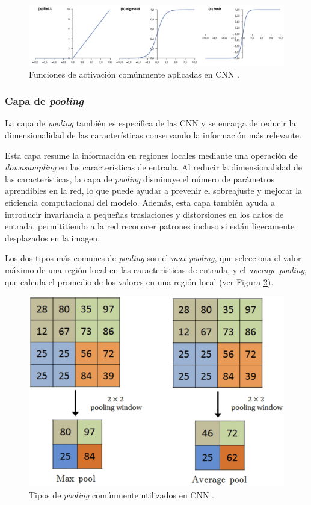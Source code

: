\begin{figure}[h]
	\centering
	\includegraphics[scale=0.55]{imagenes/cap2/activation.png}
	\caption[Funciones de activación comunes.]{Funciones de activación comúnmente aplicadas en CNN \cite{40}.}
	\label{fig8}
\end{figure}

\subsubsection*{Capa de \textit{pooling}}
La capa de \textit{pooling} también es específica de las CNN y se encarga de reducir la dimensionalidad de las características conservando la información más relevante.

Esta capa resume la información en regiones locales mediante una operación de \textit{downsampling} en las características de entrada. Al reducir la dimensionalidad de las características, la capa de \textit{pooling} disminuye el número de parámetros aprendibles en la red, lo que puede ayudar a prevenir el sobreajuste y mejorar la eficiencia computacional del modelo. Además, esta capa también ayuda a introducir invariancia a pequeñas traslaciones y distorsiones en los datos de entrada, permititiendo a la red reconocer patrones incluso si están ligeramente desplazados en la imagen. 

Los dos tipos más comunes de \textit{pooling} son el \textit{max pooling}, que selecciona el valor máximo de una región local en las características de entrada, y el \textit{average pooling}, que calcula el promedio de los valores en una región local (ver Figura \ref{fig9}).

\begin{figure}[h]
	\centering
	\includegraphics[scale=0.55]{imagenes/cap2/pooling.png}
	\caption[Tipos de \textit{pooling} comunes.]{Tipos de \textit{pooling} comúnmente utilizados en CNN \cite{42}.}
	\label{fig9}
\end{figure}

